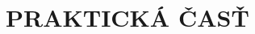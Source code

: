 \documentclass{template-definitions/thesistbuinzlin}
\begin{document}
\part{PRAKTICKÁ ČASŤ}






\paragraphindentationstop


\insertlistofreferences


\end{document}
